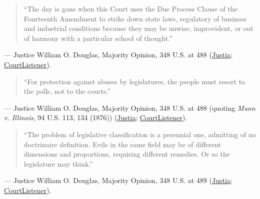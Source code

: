\documentclass[12pt]{article}
\begin{document}
\begin{quote}
``The day is gone when this Court uses the Due Process Clause of the Fourteenth Amendment to strike down state laws, regulatory of business and industrial conditions because they may be unwise, improvident, or out of harmony with a particular school of thought.''
\end{quote}
\noindent --- Justice William O. Douglas, Majority Opinion, 348 U.S. at 488 (\href{https://supreme.justia.com/cases/federal/us/348/483/}{Justia}; \href{https://www.courtlistener.com/opinion/105285/williamson-v-lee-optical-of-oklahoma-inc/}{CourtListener}).

\begin{quote}
``For protection against abuses by legislatures, the people must resort to the polls, not to the courts.''
\end{quote}
\noindent --- Justice William O. Douglas, Majority Opinion, 348 U.S. at 488 (quoting \textit{Munn v. Illinois}, 94 U.S. 113, 134 (1876)) (\href{https://supreme.justia.com/cases/federal/us/348/483/}{Justia}; \href{https://www.courtlistener.com/opinion/105285/williamson-v-lee-optical-of-oklahoma-inc/}{CourtListener}).

\begin{quote}
``The problem of legislative classification is a perennial one, admitting of no doctrinaire definition. Evils in the same field may be of different dimensions and proportions, requiring different remedies. Or so the legislature may think.''
\end{quote}
\noindent --- Justice William O. Douglas, Majority Opinion, 348 U.S. at 489 (\href{https://supreme.justia.com/cases/federal/us/348/483/}{Justia}; \href{https://www.courtlistener.com/opinion/105285/williamson-v-lee-optical-of-oklahoma-inc/}{CourtListener}).
\end{document}
